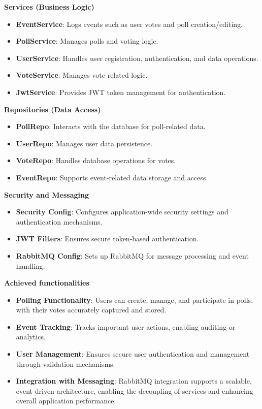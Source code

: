 \noindent \textbf{Services (Business Logic)}
\begin{itemize}
    \item \textbf{EventService}: Logs events such as user votes and poll creation/editing.
    \item \textbf{PollService}: Manages polls and voting logic.
    \item \textbf{UserService}: Handles user registration, authentication, and data operations.
    \item \textbf{VoteService}: Manages vote-related logic.
    \item \textbf{JwtService}: Provides JWT token management for authentication.
\end{itemize}

\noindent \textbf{Repositories (Data Access)}
\begin{itemize}
    \item \textbf{PollRepo}: Interacts with the database for poll-related data.
    \item \textbf{UserRepo}: Manages user data persistence.
    \item \textbf{VoteRepo}: Handles database operations for votes.
    \item \textbf{EventRepo}: Supports event-related data storage and access.
\end{itemize}

\noindent \textbf{Security and Messaging}
\begin{itemize}
    \item \textbf{Security Config}: Configures application-wide security settings and authentication mechanisms.
    \item \textbf{JWT Filters}: Ensures secure token-based authentication.
    \item \textbf{RabbitMQ Config}: Sets up RabbitMQ for message processing and event handling.
\end{itemize}

\vspace{0.5cm}
\noindent \textbf{Achieved functionalities}
\begin{itemize}
    \item \textbf{Polling Functionality}: Users can create, manage, and participate in polls, with their votes accurately captured and stored.
    \item \textbf{Event Tracking}: Tracks important user actions, enabling auditing or analytics.
    \item \textbf{User Management}: Ensures secure user authentication and management through validation mechanisms.
    \item \textbf{Integration with Messaging}: RabbitMQ integration supports a scalable, event-driven architecture, enabling the decoupling of services and enhancing overall application performance.
\end{itemize}